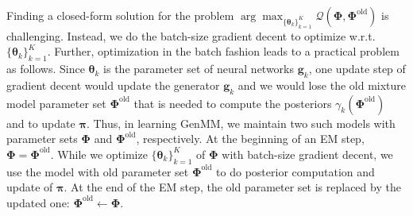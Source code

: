 Finding a closed-form solution for the problem $\arg \max_{\{\bm{\theta}_k\}_{k=1}^{K}} \mathcal{Q} (\bm{\Phi},\bm{\Phi}^{\mathrm{old}})$ is challenging. Instead, we do the batch-size gradient decent to optimize w.r.t. $\{\bm{\theta}_k\}_{k=1}^{K}$.
Further, optimization in the batch fashion leads to a practical problem as follows. 
Since $\bm{\theta}_k$ is the parameter set of neural networks $\bm{g}_k$, one update step of gradient decent would update the generator $\bm{g}_k$ and we would lose the old mixture model parameter set $\bm{\Phi}^{\mathrm{old}}$ that is needed to compute the posteriors $\gamma_k(\bm{\Phi}^{\mathrm{old}})$ and to update $\bm{\pi}$. Thus, in learning GenMM, we maintain two such models with parameter sets $\bm{\Phi}$ and $\bm{\Phi}^{\mathrm{old}}$, respectively. At the beginning of an EM step, $\bm{\Phi} = \bm{\Phi}^{\mathrm{old}}$. While we optimize $\{\bm{\theta}_k\}_{k=1}^{K}$ of $\bm{\Phi}$ with batch-size gradient decent, we use the model with old parameter set $\bm{\Phi}^{\mathrm{old}}$ to do posterior computation and update of $\bm{\pi}$. At the end of the EM step, the old parameter set is replaced by the updated one: $\bm{\Phi}^{\mathrm{old}}\gets \bm{\Phi}$.




